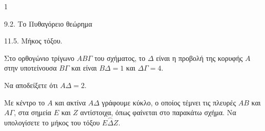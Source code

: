 \begin{ylh}{1}
    \item 9.2. Το Πυθαγόρειο θεώρημα
    \item 11.5. Μήκος τόξου.
\end{ylh}
\begin{figure}
\end{figure}
Στο ορθογώνιο τρίγωνο $ΑΒΓ$ του σχήματος, το $Δ$ είναι η προβολή της κορυφής $Α$ στην υποτείνουσα $ΒΓ$ και είναι $ΒΔ = 1$ και $ΔΓ = 4$.
\begin{alist}
\item Να αποδείξετε ότι $ΑΔ = 2$. 
\item Με κέντρο το $Α$ και ακτίνα $ΑΔ$ γράφουμε κύκλο, ο οποίος τέμνει τις πλευρές $ΑΒ$ και $ΑΓ$, στα σημεία $E$ και $Z$ αντίστοιχα, όπως φαίνεται στο παρακάτω σχήμα. Να υπολογίσετε το μήκος του τόξου $\overset{\frown}{E\Delta Z}$. 
\end{alist}